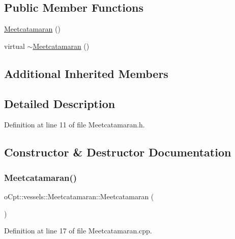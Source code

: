 \subsection*{Public Member Functions}
\begin{DoxyCompactItemize}
\item 
\hyperlink{classo_cpt_1_1vessels_1_1_meetcatamaran_a89e35d5f1122d5381eb0884ca4153190}{Meetcatamaran} ()
\item 
virtual \hyperlink{classo_cpt_1_1vessels_1_1_meetcatamaran_a7dc48a66640ceb06f1cfba9a112308b7}{$\sim$\+Meetcatamaran} ()
\end{DoxyCompactItemize}
\subsection*{Additional Inherited Members}


\subsection{Detailed Description}


Definition at line 11 of file Meetcatamaran.\+h.



\subsection{Constructor \& Destructor Documentation}
\hypertarget{classo_cpt_1_1vessels_1_1_meetcatamaran_a89e35d5f1122d5381eb0884ca4153190}{}\label{classo_cpt_1_1vessels_1_1_meetcatamaran_a89e35d5f1122d5381eb0884ca4153190} 
\subsubsection{\texorpdfstring{Meetcatamaran()}{Meetcatamaran()}}
{\footnotesize\ttfamily o\+Cpt\+::vessels\+::\+Meetcatamaran\+::\+Meetcatamaran (\begin{DoxyParamCaption}{ }\end{DoxyParamCaption})}



Definition at line 17 of file Meetcatamaran.\+cpp.

\hypertarget{classo_cpt_1_1vessels_1_1_meetcatamaran_a7dc48a66640ceb06f1cfba9a112308b7}{}\label{classo_cpt_1_1vessels_1_1_meetcatamaran_a7dc48a66640ceb06f1cfba9a112308b7} 
